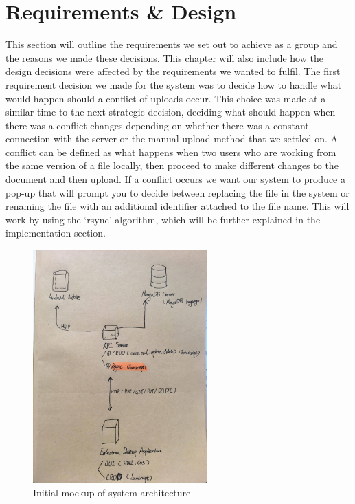 \documentclass[11pt]{article}
\begin{document}
\section{Requirements \& Design}

This section will outline the requirements we set out to achieve as a group and the reasons we made these decisions. This chapter will also include how the design decisions were affected by the requirements we wanted to fulfil. 
The first requirement decision we made for the system was to decide how to handle what would happen should a conflict of uploads occur. This choice was made at a similar time to the next strategic decision, deciding what should happen when there was a conflict changes depending on whether there was a constant connection with the server or the manual upload method that we settled on. A conflict can be defined as what happens when two users who are working from the same version of a file locally, then proceed to make different changes to the document and then upload. If a conflict occurs we want our system to produce a pop-up that will prompt you to decide between replacing the file in the system or renaming the file with an additional identifier attached to the file name. This will work by using the ‘rsync’ algorithm, which will be further explained in the implementation section.


\begin{figure} [H]
\caption{Initial mockup of system architecture}
\centering
\includegraphics[width=0.6\textwidth]{Group_Project/drawing.jpg}
\end{figure}
\end{document}
